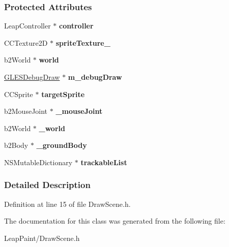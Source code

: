 \subsubsection*{Protected Attributes}
\begin{DoxyCompactItemize}
\item 
\hypertarget{interface_draw_scene_ac36f68c45c23e02ba1e3ba5ae0f94aab}{Leap\-Controller $\ast$ {\bfseries controller}}\label{df/dce/interface_draw_scene_ac36f68c45c23e02ba1e3ba5ae0f94aab}

\item 
\hypertarget{interface_draw_scene_a4b9fdea49405f46eb5db8c8fde01e4c4}{C\-C\-Texture2\-D $\ast$ {\bfseries sprite\-Texture\-\_\-}}\label{df/dce/interface_draw_scene_a4b9fdea49405f46eb5db8c8fde01e4c4}

\item 
\hypertarget{interface_draw_scene_a21e748545a8a2f2813aef45e002c5384}{b2\-World $\ast$ {\bfseries world}}\label{df/dce/interface_draw_scene_a21e748545a8a2f2813aef45e002c5384}

\item 
\hypertarget{interface_draw_scene_aa219f6d98a9af39f65e463a35bd92ba0}{\hyperlink{class_g_l_e_s_debug_draw}{G\-L\-E\-S\-Debug\-Draw} $\ast$ {\bfseries m\-\_\-debug\-Draw}}\label{df/dce/interface_draw_scene_aa219f6d98a9af39f65e463a35bd92ba0}

\item 
\hypertarget{interface_draw_scene_aa2b2731e2d00a9e2f6751d20ae592398}{C\-C\-Sprite $\ast$ {\bfseries target\-Sprite}}\label{df/dce/interface_draw_scene_aa2b2731e2d00a9e2f6751d20ae592398}

\item 
\hypertarget{interface_draw_scene_a50447a317c54432a6e105a6d202a28b5}{b2\-Mouse\-Joint $\ast$ {\bfseries \-\_\-mouse\-Joint}}\label{df/dce/interface_draw_scene_a50447a317c54432a6e105a6d202a28b5}

\item 
\hypertarget{interface_draw_scene_a40f948e5bd44348bcabea8976c073dda}{b2\-World $\ast$ {\bfseries \-\_\-world}}\label{df/dce/interface_draw_scene_a40f948e5bd44348bcabea8976c073dda}

\item 
\hypertarget{interface_draw_scene_acc7f9743c4edd8f12fd05735c16c2f9d}{b2\-Body $\ast$ {\bfseries \-\_\-ground\-Body}}\label{df/dce/interface_draw_scene_acc7f9743c4edd8f12fd05735c16c2f9d}

\item 
\hypertarget{interface_draw_scene_a0852f9cd614e5282018b895fd8b6177c}{N\-S\-Mutable\-Dictionary $\ast$ {\bfseries trackable\-List}}\label{df/dce/interface_draw_scene_a0852f9cd614e5282018b895fd8b6177c}

\end{DoxyCompactItemize}


\subsubsection{Detailed Description}


Definition at line 15 of file Draw\-Scene.\-h.



The documentation for this class was generated from the following file\-:\begin{DoxyCompactItemize}
\item 
Leap\-Paint/Draw\-Scene.\-h\end{DoxyCompactItemize}
